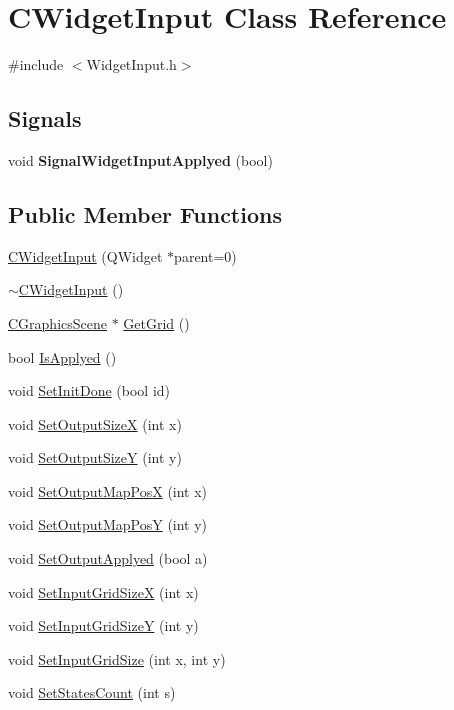 \hypertarget{classCWidgetInput}{
\section{CWidgetInput Class Reference}
\label{classCWidgetInput}
}


{\ttfamily \#include $<$WidgetInput.h$>$}\subsection*{Signals}
\begin{DoxyCompactItemize}
\item 
\hypertarget{classCWidgetInput_a05bd031f99a0d2e55967169112339fe0}{
void {\bfseries SignalWidgetInputApplyed} (bool)}
\label{classCWidgetInput_a05bd031f99a0d2e55967169112339fe0}

\end{DoxyCompactItemize}
\subsection*{Public Member Functions}
\begin{DoxyCompactItemize}
\item 
\hyperlink{classCWidgetInput_a7595b91af57924e97909c96956031371}{CWidgetInput} (QWidget $\ast$parent=0)
\item 
\hyperlink{classCWidgetInput_afc915feb98e5ef4c8e6f8289ff26e4ef}{$\sim$CWidgetInput} ()
\item 
\hyperlink{classCGraphicsScene}{CGraphicsScene} $\ast$ \hyperlink{classCWidgetInput_aa4ed42952441c02ef7c852611e470bf6}{GetGrid} ()
\item 
bool \hyperlink{classCWidgetInput_abb4665c76fc6fa6596672492d2692fa5}{IsApplyed} ()
\item 
void \hyperlink{classCWidgetInput_ab20a7e7c2209a646e1344da181ed3b4c}{SetInitDone} (bool id)
\item 
void \hyperlink{classCWidgetInput_a973d6f19d85ece1c17c09c6d3b1a1d46}{SetOutputSizeX} (int x)
\item 
void \hyperlink{classCWidgetInput_a45e0226b68c3a47a1ad5f06a6fe6ba37}{SetOutputSizeY} (int y)
\item 
void \hyperlink{classCWidgetInput_a41ac9fa40929572261cb934016f77696}{SetOutputMapPosX} (int x)
\item 
void \hyperlink{classCWidgetInput_afdec7dfcd6c8a970fcf0bc62d5b3b723}{SetOutputMapPosY} (int y)
\item 
void \hyperlink{classCWidgetInput_ae3634dfaddc44903f0e15355a72fa673}{SetOutputApplyed} (bool a)
\item 
void \hyperlink{classCWidgetInput_a1b9d9ef0878868858b802f1fb1272693}{SetInputGridSizeX} (int x)
\item 
void \hyperlink{classCWidgetInput_a923841c18ee3d55ab086f65723fb9431}{SetInputGridSizeY} (int y)
\item 
void \hyperlink{classCWidgetInput_a53c69e51933f81dee38ce9eb7c935c70}{SetInputGridSize} (int x, int y)
\item 
void \hyperlink{classCWidgetInput_ad672ebec4ec33aff45c8d6ffd3cf6c12}{SetStatesCount} (int s)
\end{DoxyCompactItemize}
